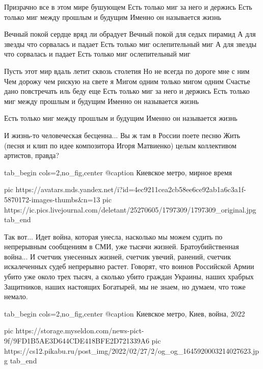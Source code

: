 \raggedcolumns
\begin{multicols}{2} %
\setlength{\parindent}{0pt}
\obeycr
Призрачно все в этом мире бушующем
Есть только миг за него и держись
Есть только миг между прошлым и будущим
Именно он называется жизнь

Вечный покой сердце вряд ли обрадует
Вечный покой для седых пирамид
А для звезды что сорвалась и падает
Есть только миг ослепительный миг
А для звезды что сорвалась и падает
Есть только миг ослепительный миг

Пусть этот мир вдаль летит сквозь столетия
Но не всегда по дороге мне с ним
Чем дорожу чем рискую на свете я
Мигом одним только мигом одним
Счастье дано повстречать иль беду еще
Есть только миг за него и держись
Есть только миг между прошлым и будущим
Именно он называется жизнь

Есть только миг между прошлым и будущим
Именно он называется жизнь
\restorecr
\end{multicols} %

И жизнь-то человеческая бесценна... Вы ж там в России поете песню Жить (песня и
клип по идее композитора Игоря Матвиенко) целым коллективом артистов, правда?

\ifcmt
  tab_begin cols=2,no_fig,center
		 @caption Киевское метро, мирное время

     pic https://avatars.mds.yandex.net/i?id=4ec9211cea2cb58ee6ce92ab1a6c3a1f-5870172-images-thumbs&n=13
		 pic https://ic.pics.livejournal.com/deletant/25270605/1797309/1797309_original.jpg
  tab_end
\fi

Так вот... Идет война, которая унесла, насколько мы можем судить по непрерывным
сообщениям в СМИ, уже тысячи жизней. Братоубийственная война... И счетчик
унесенных жизней, счетчик увечий, ранений, счетчик искалеченных судеб
непрерывно растет. Говорят, что воинов Российской Армии убито уже около трех
тысяч, а сколько убито граждан Украины, наших храбрых Защитников, наших
настоящих Богатырей, мы не знаем, но думаем, что тоже немало. 

\ifcmt
  tab_begin cols=2,no_fig,center
		 @caption Киевское метро, Киев, война, 2022

		 pic https://storage.myseldon.com/news-pict-9f/9FD1B5AE3D644CDE418BFE2D721339A6
     pic https://cs12.pikabu.ru/post_img/2022/02/27/2/og_og_1645920003214027623.jpg
  tab_end
\fi


